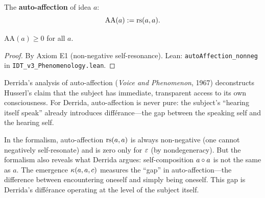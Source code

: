 \begin{definition}
\label{def:auto-affection}
The \textbf{auto-affection} of idea $a$:
\[
\mathrm{AA}(a) := \mathrm{rs}(a, a).
\]
\end{definition}

\begin{theorem}
\label{thm:auto-affection-nonneg}
$\mathrm{AA}(a) \geq 0$ for all $a$.
\end{theorem}

\begin{proof}
By Axiom E1 (non-negative self-resonance).
Lean: \texttt{autoAffection\_nonneg} in \texttt{IDT\_v3\_Phenomenology.lean}.
\end{proof}

\begin{interpretation}
Derrida's analysis of auto-affection (\textit{Voice and Phenomenon}, 1967)
deconstructs Husserl's claim that the subject has immediate, transparent
access to its own consciousness. For Derrida, auto-affection is never pure:
the subject's ``hearing itself speak'' already introduces diff\'erance---the
gap between the speaking self and the hearing self.

In the formalism, auto-affection $\mathrm{rs}(a, a)$ is always non-negative (one
cannot negatively self-resonate) and is zero only for $\varepsilon$ (by
nondegeneracy). But the formalism also reveals what Derrida argues: self-composition
$a \circ a$ is not the same as $a$. The emergence $\kappa(a, a, c)$
measures the ``gap'' in auto-affection---the difference between encountering
oneself and simply being oneself. This gap is Derrida's diff\'erance operating
at the level of the subject itself.
\end{interpretation}

